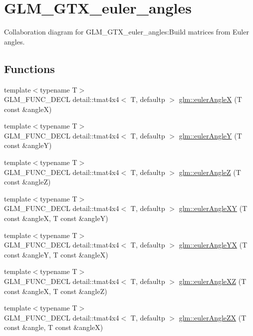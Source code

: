 \hypertarget{group__gtx__euler__angles}{
\section{GLM\_\-GTX\_\-euler\_\-angles}
\label{group__gtx__euler__angles}
}


Collaboration diagram for GLM\_\-GTX\_\-euler\_\-angles:Build matrices from Euler angles.  
\subsection*{Functions}
\begin{CompactItemize}
\item 
{\footnotesize template$<$typename T$>$ }\\GLM\_\-FUNC\_\-DECL detail::tmat4x4$<$ T, defaultp $>$ \hyperlink{group__gtx__euler__angles_g5fb8269b6795f95dec7ca7bbe61805f6}{glm::eulerAngleX} (T const \&angleX)
\item 
{\footnotesize template$<$typename T$>$ }\\GLM\_\-FUNC\_\-DECL detail::tmat4x4$<$ T, defaultp $>$ \hyperlink{group__gtx__euler__angles_g558b0e0fd3c1f6a414d184a22c968b79}{glm::eulerAngleY} (T const \&angleY)
\item 
{\footnotesize template$<$typename T$>$ }\\GLM\_\-FUNC\_\-DECL detail::tmat4x4$<$ T, defaultp $>$ \hyperlink{group__gtx__euler__angles_ge77e2c08c118ecd34ffc8ca425d2cf77}{glm::eulerAngleZ} (T const \&angleZ)
\item 
{\footnotesize template$<$typename T$>$ }\\GLM\_\-FUNC\_\-DECL detail::tmat4x4$<$ T, defaultp $>$ \hyperlink{group__gtx__euler__angles_g6a2dc9bf80aecdffb3e5ab3bcede6647}{glm::eulerAngleXY} (T const \&angleX, T const \&angleY)
\item 
{\footnotesize template$<$typename T$>$ }\\GLM\_\-FUNC\_\-DECL detail::tmat4x4$<$ T, defaultp $>$ \hyperlink{group__gtx__euler__angles_gd26afd5add0e121296d3b44dea32f32e}{glm::eulerAngleYX} (T const \&angleY, T const \&angleX)
\item 
{\footnotesize template$<$typename T$>$ }\\GLM\_\-FUNC\_\-DECL detail::tmat4x4$<$ T, defaultp $>$ \hyperlink{group__gtx__euler__angles_g9b63e52fda0b7773c50bbf3c310bdcf2}{glm::eulerAngleXZ} (T const \&angleX, T const \&angleZ)
\item 
{\footnotesize template$<$typename T$>$ }\\GLM\_\-FUNC\_\-DECL detail::tmat4x4$<$ T, defaultp $>$ \hyperlink{group__gtx__euler__angles_g3709f9eb45b49ecf41d42bec91c031fa}{glm::eulerAngleZX} (T const \&angle, T const \&angleX)

\end{CompactItemize}

